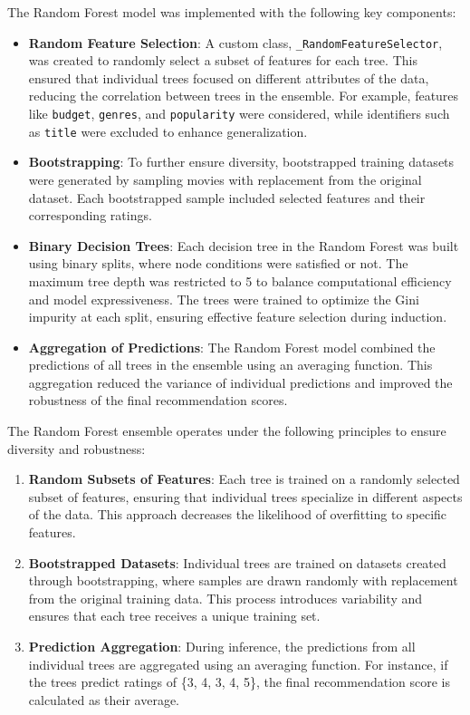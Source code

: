 \documentclass[a4paper,9pt]{article}
\begin{document}
The Random Forest model was implemented with the
following key components:

\begin{itemize}
	\item \textbf{Random Feature Selection}:
	      A custom class, \texttt{\_RandomFeatureSelector}, was created to randomly select a subset of features for each tree. This ensured that individual trees focused on different attributes of the data, reducing the correlation between trees in the ensemble. For example, features like \texttt{budget}, \texttt{genres}, and \texttt{popularity} were considered, while identifiers such as \texttt{title} were excluded to enhance generalization.
	\item \textbf{Bootstrapping}:
	      To further ensure diversity, bootstrapped training datasets were generated by sampling movies with replacement from the original dataset. Each bootstrapped sample included selected features and their corresponding ratings.
	\item \textbf{Binary Decision Trees}:
	      Each decision tree in the Random Forest was built using binary splits, where node conditions were satisfied or not. The maximum tree depth was restricted to 5 to balance computational efficiency and model expressiveness. The trees were trained to optimize the Gini impurity at each split, ensuring effective feature selection during induction.
	\item \textbf{Aggregation of Predictions}:
	      The Random Forest model combined the predictions of all trees in the ensemble using an averaging function. This aggregation reduced the variance of individual predictions and improved the robustness of the final recommendation scores.
\end{itemize}

The Random Forest ensemble operates under the following principles to ensure diversity and robustness:

\begin{enumerate}
	\item \textbf{Random Subsets of Features}:
	      Each tree is trained on a randomly selected subset of features, ensuring that individual trees specialize in different aspects of the data. This approach decreases the likelihood of overfitting to specific features.
	\item \textbf{Bootstrapped Datasets}:
	      Individual trees are trained on datasets created through bootstrapping, where samples are drawn randomly with replacement from the original training data. This process introduces variability and ensures that each tree receives a unique training set.
	\item \textbf{Prediction Aggregation}:
	      During inference, the predictions from all individual trees are aggregated using an averaging function. For instance, if the trees predict ratings of \{3, 4, 3, 4, 5\}, the final recommendation score is calculated as their average.
\end{enumerate}
\end{document}
